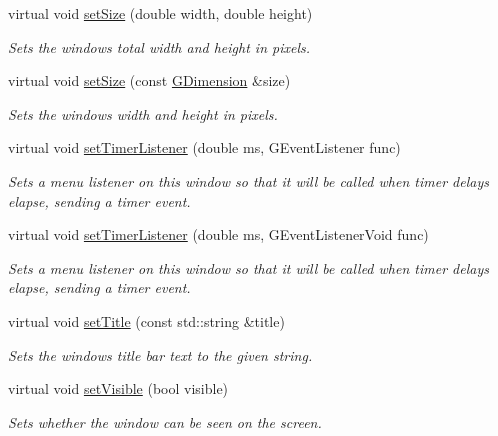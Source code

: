 \begin{DoxyCompactItemize}
virtual void \mbox{\hyperlink{classGWindow_aca25d49481f9bf5fc8f7df4c086c4ce7}{set\+Size}} (double width, double height)
\begin{DoxyCompactList}\small\item\em Sets the window\textquotesingle{}s total width and height in pixels. \end{DoxyCompactList}\item 
virtual void \mbox{\hyperlink{classGWindow_ae2b628228f192c2702c4ce941b2af68f}{set\+Size}} (const \mbox{\hyperlink{classGDimension}{G\+Dimension}} \&size)
\begin{DoxyCompactList}\small\item\em Sets the window\textquotesingle{}s width and height in pixels. \end{DoxyCompactList}\item 
virtual void \mbox{\hyperlink{classGWindow_ae0d5df4c2ed47156cbba7da55362e4e1}{set\+Timer\+Listener}} (double ms, G\+Event\+Listener func)
\begin{DoxyCompactList}\small\item\em Sets a menu listener on this window so that it will be called when timer delays elapse, sending a timer event. \end{DoxyCompactList}\item 
virtual void \mbox{\hyperlink{classGWindow_ae23e03c86580bbcefc2dee4d01d08091}{set\+Timer\+Listener}} (double ms, G\+Event\+Listener\+Void func)
\begin{DoxyCompactList}\small\item\em Sets a menu listener on this window so that it will be called when timer delays elapse, sending a timer event. \end{DoxyCompactList}\item 
virtual void \mbox{\hyperlink{classGWindow_abc79cf0667bbb5c93fca3f01b52c7b57}{set\+Title}} (const std\+::string \&title)
\begin{DoxyCompactList}\small\item\em Sets the window\textquotesingle{}s title bar text to the given string. \end{DoxyCompactList}\item 
virtual void \mbox{\hyperlink{classGWindow_a18e44e30b31525a243960ca3928125aa}{set\+Visible}} (bool visible)
\begin{DoxyCompactList}\small\item\em Sets whether the window can be seen on the screen. \end{DoxyCompactList}\item 

\end{DoxyCompactItemize}
